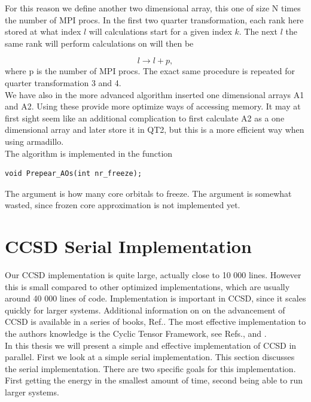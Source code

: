 \documentclass[a4paper,norsk,11pt,twoside]{report}
\begin{document}
For this reason we define another two dimensional array, this one of size N times the number of MPI procs. In the first two quarter transformation, each rank here stored at what index $l$ will calculations start for a given index $k$. The next $l$ the same rank will perform calculations on will then be 

\begin{equation}
l \rightarrow l + p ,
\end{equation}
where p is the number of MPI procs. The exact same procedure is repeated for quarter transformation 3 and 4. \\

We have also in the more advanced algorithm inserted one dimensional arrays A1 and A2. Using these provide more optimize ways of accessing memory. It may at first sight seem like an additional complication to first calculate A2 as a one dimensional array and later store it in QT2, but this is a more efficient way when using armadillo. \\

The algorithm is implemented in the function 

\begin{lstlisting}
void Prepear_AOs(int nr_freeze);
\end{lstlisting}
The argument is how many core orbitals to freeze. The argument is somewhat wasted, since frozen core approximation is not implemented yet.

\section{CCSD Serial Implementation \label{optimize_serial_version_bii}}
Our CCSD implementation is quite large, actually close to 10 000 lines. However this is small compared to other optimized implementations, which are usually around 40 000 lines of code. Implementation is important in CCSD, since it scales quickly for larger systems. Additional information on on the advancement of CCSD is available in a series of books, Ref.\cite{book_om_advancements_ccsd}. The most effective implementation to the authors knowledge is the Cyclic Tensor Framework, see Refs.\cite{most_effective_ccsd_dude}, \cite{most_effective_ccsd_dude2} and \cite{most_effective_ccsd_dude3}. \\

In this thesis we will present a simple and effective implementation of CCSD in parallel. First we look at a simple serial implementation. This section discusses the serial implementation. There are two specific goals for this implementation. First getting the energy in the smallest amount of time, second being able to run larger systems. \\
\end{document}
